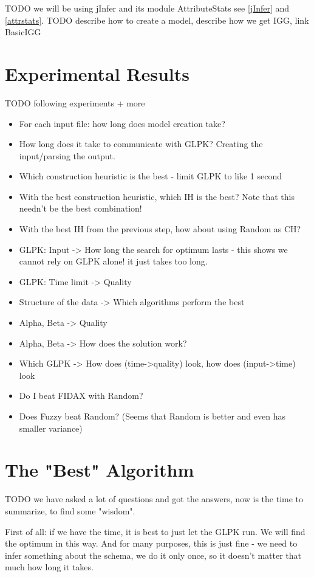 \documentclass[a4paper,12pt,oneside]{report}
\begin{document}
TODO we will be using jInfer and its module AttributeStats see \ref{jInfer} and \ref{attrstats}.
TODO describe how to create a model, describe how we get IGG, link BasicIGG

\section{Experimental Results}

TODO following experiments + more

\begin{itemize}
	\item For each input file: how long does model creation take?
	\item How long does it take to communicate with GLPK? Creating the input/parsing the output.
	\item Which construction heuristic is the best - limit GLPK to like 1 second
	\item With the best construction heuristic, which IH is the best? Note that this needn't be the best combination!
	\item With the best IH from the previous step, how about using Random as CH?
	\item GLPK: Input -> How long the search for optimum lasts - this shows we cannot rely on GLPK alone! it just takes too long.
	\item GLPK: Time limit -> Quality
	\item Structure of the data -> Which algorithms perform the best
	\item Alpha, Beta -> Quality
	\item Alpha, Beta -> How does the solution work?
	\item Which GLPK -> How does (time->quality) look, how does (input->time) look
	\item Do I beat FIDAX with Random?
	\item Does Fuzzy beat Random? (Seems that Random is better and even has smaller variance)
\end{itemize}

\section{The "Best" Algorithm}

TODO we have asked a lot of questions and got the answers, now is the time to summarize, to find some "wisdom".

First of all: if we have the time, it is best to just let the GLPK run. 
We will find the optimum in this way. 
And for many purposes, this is just fine - we need to infer something about the schema, we do it only once, so it doesn't matter that much how long it takes.
\end{document}
